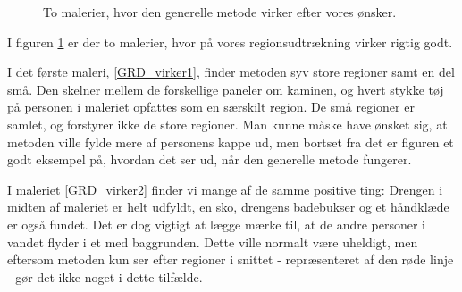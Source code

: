 \begin{figure}[!h]
{        	\label{GRD_virker1}}\hspace{1em}
		\hspace{1em}
        \caption[]{To malerier, hvor den generelle metode virker efter vores ønsker.}
     \label{generelde_region_detektor_virker}
\end{figure}

I figuren \ref{generelde_region_detektor_virker} er der to malerier,
hvor på vores regionsudtrækning virker rigtig godt. 

I det første maleri, \ref{GRD_virker1}, finder metoden syv store regioner
samt en del små. Den skelner mellem de forskellige paneler om kaminen,
og hvert stykke tøj på personen i maleriet opfattes som en særskilt
region. De små regioner er samlet, og forstyrer ikke de store
regioner.
Man kunne måske have ønsket sig, at metoden ville fylde mere af
personens kappe ud, men bortset fra det er figuren et godt eksempel på,
hvordan det ser ud, når den generelle metode fungerer.

I maleriet \ref{GRD_virker2} finder vi mange af de samme positive ting:
Drengen i midten af maleriet er helt udfyldt, en sko, drengens
badebukser og et håndklæde er også fundet. Det er dog vigtigt at lægge
mærke
til, at de andre personer i vandet flyder i et med baggrunden. Dette
ville normalt være uheldigt, men eftersom metoden kun ser efter regioner
i snittet - repræsenteret af den røde linje - gør det ikke noget i dette
tilfælde.

